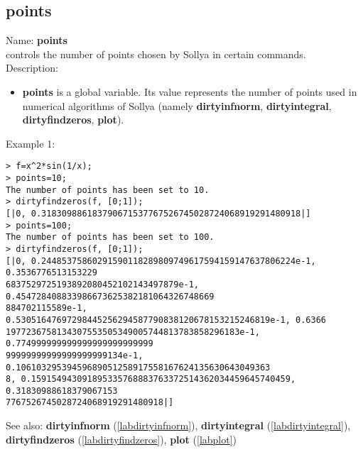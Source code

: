 \subsection{points}
\label{labpoints}
\noindent Name: \textbf{points}\\
controls the number of points chosen by Sollya in certain commands.\\

\noindent Description: \begin{itemize}

\item \textbf{points} is a global variable. Its value represents the number of points
   used in numerical algorithms of Sollya (namely \textbf{dirtyinfnorm},
   \textbf{dirtyintegral}, \textbf{dirtyfindzeros}, \textbf{plot}).
\end{itemize}
\noindent Example 1: 
\begin{center}\begin{minipage}{15cm}\begin{Verbatim}[frame=single]
> f=x^2*sin(1/x);
> points=10;
The number of points has been set to 10.
> dirtyfindzeros(f, [0;1]);
[|0, 0.318309886183790671537767526745028724068919291480918|]
> points=100;
The number of points has been set to 100.
> dirtyfindzeros(f, [0;1]);
[|0, 0.24485375860291590118289809749617594159147637806224e-1, 0.3536776513153229
6837529725193892080452102143497879e-1, 0.454728408833986673625382181064326748669
884702115589e-1, 0.53051647697298445256294587790838120678153215246819e-1, 0.6366
1977236758134307553505349005744813783858296183e-1, 0.774999999999999999999999999
99999999999999999999134e-1, 0.10610329539459689051258917558167624135630643049363
8, 0.159154943091895335768883763372514362034459645740459, 0.31830988618379067153
7767526745028724068919291480918|]
\end{Verbatim}
\end{minipage}\end{center}
See also: \textbf{dirtyinfnorm} (\ref{labdirtyinfnorm}), \textbf{dirtyintegral} (\ref{labdirtyintegral}), \textbf{dirtyfindzeros} (\ref{labdirtyfindzeros}), \textbf{plot} (\ref{labplot})

